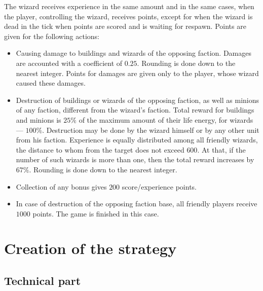 The wizard receives experience in the same amount and in the same cases, when the player, controlling the wizard, receives points, except for when
the wizard is dead in the tick when points are scored and is waiting for respawn. Points are given for the following actions:
\begin{itemize}
            \item Causing damage to buildings and wizards of the opposing faction. Damages are accounted with a coefficient of $0.25$. Rounding
            is done down to the nearest integer. Points for damages are given only to the player, whose wizard caused these
            damages.
            \item Destruction of buildings or wizards of the opposing faction, as well as minions of any faction, different from the wizard's faction.
            Total reward for buildings and minions is $25\%$ of the maximum amount of their life energy, for wizards ---
            $100\%$. Destruction may be done by the wizard himself or by any other unit from his faction. Experience is equally
            distributed among all friendly wizards, the distance to whom from the target does not exceed $600$. At that, if the number of
            such wizards is more than one, then the total reward increases by $67\%$. Rounding is done down to the nearest
            integer.
            \item Collection of any bonus gives $200$ score/experience points.
            \item In case of destruction of the opposing faction base, all friendly players receive $1000$ points. The game is finished in this case.
\end{itemize}
 
\chapter{Creation of the strategy}
 
\section{Technical part}
 
